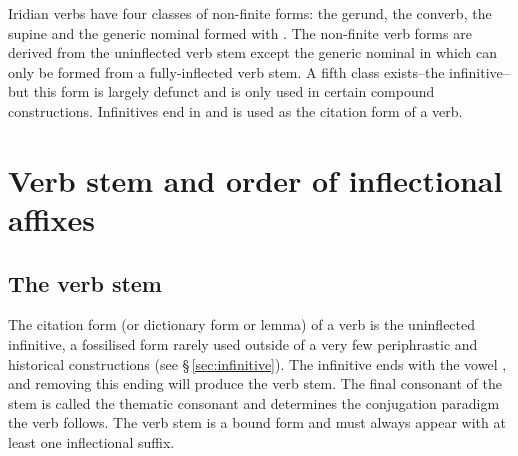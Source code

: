 \par Iridian verbs have four classes of non-finite forms: the gerund, the converb, the supine and the generic nominal formed with . The non-finite verb forms are derived from the uninflected verb stem except the generic nominal in  which can only be formed from a fully-inflected verb stem. A fifth class exists--the infinitive--but this form is largely defunct and is only used in certain compound constructions. Infinitives end in  and is used as the citation form of a verb.

\section{Verb stem and order of inflectional affixes}


\subsection{The verb stem}
\par The {\sc citation form} (or {\sc dictionary form} or {\sc lemma}) of a verb is the uninflected {\sc infinitive}, a fossilised form rarely used outside of a very few periphrastic and historical constructions (see \S\,\ref{sec:infinitive}). The infinitive ends with the vowel , and removing this ending will produce the {\sc verb stem}. The final consonant  of the stem is called the thematic consonant and determines the conjugation paradigm the verb follows. The verb stem is a bound form and must always appear with at least one inflectional suffix. 


